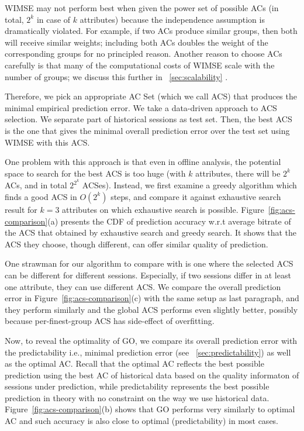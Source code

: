 WIMSE may not perform best when given the power set of possible ACs (in total, $2^k$ in case of $k$ attributes) because the independence assumption is dramatically violated.  For example, if two ACs produce similar groups, then both will receive similar weights; including both ACs doubles the weight of the corresponding groups for no principled reason.
 Another reason to choose ACs carefully is that many of the computational costs of WIMSE scale with the number of groups; we discuss this further in \Section~\ref{sec:scalability} .

Therefore, we pick an appropriate AC Set (which we call ACS) that produces the minimal empirical prediction error. 
We take a data-driven approach to ACS selection. We separate part of historical sessions as test set. Then, the best ACS is the one that gives the minimal overall prediction error over the test set using WIMSE with this ACS.

 One problem with this approach is that even in offline analysis, the potential space to search for the best ACS is too huge (with $k$ attributes, there will be $2^k$ ACs, and in total $2^{2^k}$ ACSes). Instead, we first examine a greedy algorithm which finds a good ACS in $O(2^k)$ steps, and compare it against exhaustive search result for $k=3$ attributes on which exhaustive search is possible. Figure~\ref{fig:acs-comparison}(a) presents the CDF of prediction accuracy w.r.t average bitrate of the ACS that obtained by exhaustive search and greedy search. It shows that the ACS they choose, though different, can offer similar quality of prediction.


 One strawman for our algorithm to compare with is one where the selected ACS can be different for different sessions. Especially, if two sessions differ in at least one attribute, they can use different ACS. 
We compare the overall prediction error in Figure~\ref{fig:acs-comparison}(c) with the same setup as last paragraph, and they perform similarly and the global ACS performs even slightly better, possibly because per-finest-group ACS has side-effect of overfitting.

 Now, to reveal the optimality of GO, we compare its overall prediction error with the predictability i.e., minimal prediction error (see \Section~\ref{sec:predictability}) as well as the optimal AC. Recall that the optimal AC reflects the best possible prediction using the best AC of historical data based on the quality informaton of sessions under prediction, while predictability represents the best possible prediction in theory with no constraint on the way we use historical data. Figure~\ref{fig:acs-comparison}(b) shows that GO performs very similarly to optimal AC and such accuracy is also close to optimal (predictability) in most cases. 

